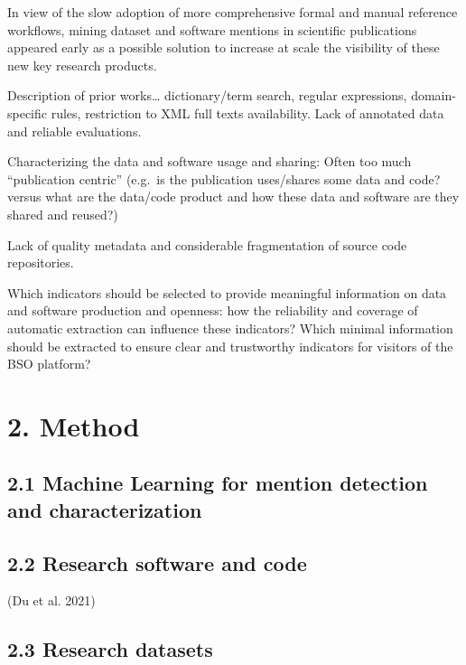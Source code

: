 \documentclass[
]{article}
\begin{document}
In view of the slow adoption of more comprehensive formal and manual
reference workflows, mining dataset and software mentions in scientific
publications appeared early as a possible solution to increase at scale
the visibility of these new key research products.

Description of prior works\ldots{} dictionary/term search, regular
expressions, domain-specific rules, restriction to XML full texts
availability. Lack of annotated data and reliable evaluations.

Characterizing the data and software usage and sharing: Often too much
``publication centric'' (e.g.~is the publication uses/shares some data
and code? versus what are the data/code product and how these data and
software are they shared and reused?)

Lack of quality metadata and considerable fragmentation of source code
repositories.

Which indicators should be selected to provide meaningful information on
data and software production and openness: how the reliability and
coverage of automatic extraction can influence these indicators? Which
minimal information should be extracted to ensure clear and trustworthy
indicators for visitors of the BSO platform?

\hypertarget{method}{%
\section{2. Method}\label{method}}

\hypertarget{machine-learning-for-mention-detection-and-characterization}{%
\subsection{2.1 Machine Learning for mention detection and
characterization}\label{machine-learning-for-mention-detection-and-characterization}}

\hypertarget{research-software-and-code}{%
\subsection{2.2 Research software and
code}\label{research-software-and-code}}

(Du et al. 2021)

\hypertarget{research-datasets}{%
\subsection{2.3 Research datasets}\label{research-datasets}}
\end{document}
